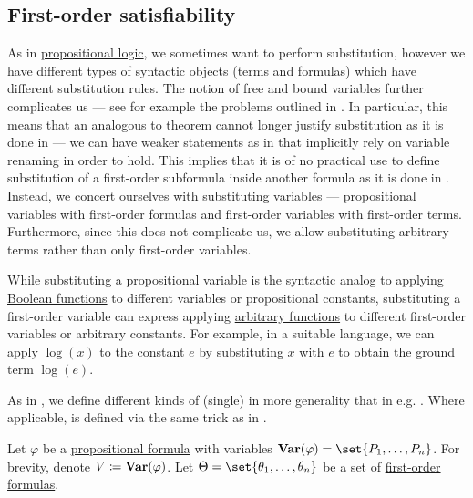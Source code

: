 \subsection{First-order satisfiability}\label{subsec:first_order_satisfiability}

\begin{definition}\label{def:first_order_substitution}
  As in \hyperref[subsec:propositional_logic]{propositional logic}, we sometimes want to perform substitution, however we have different types of syntactic objects (terms and formulas) which have different substitution rules. The notion of free and bound variables further complicates us --- see for example the problems outlined in . In particular, this means that an analogous to  theorem cannot longer justify substitution as it is done in  --- we can have weaker statements as in  that implicitly rely on variable renaming in order to hold. This implies that it is of no practical use to define substitution of a first-order subformula inside another formula as it is done in . Instead, we concert ourselves with substituting variables --- propositional variables with first-order formulas and first-order variables with first-order terms. Furthermore, since this does not complicate us, we allow substituting arbitrary terms rather than only first-order variables.

  While substituting a propositional variable is the syntactic analog to applying \hyperref[def:boolean_function]{Boolean functions} to different variables or propositional constants, substituting a first-order variable can express applying \hyperref[def:function/single_valued]{arbitrary functions} to different first-order variables or arbitrary constants. For example, in a suitable language, we can apply \( \log(x) \) to the constant \( e \) by substituting \( x \) with \( e \) to obtain the ground term \( \log(e) \).

  As in , we define different kinds of (single)  in more generality that in e.g. \cite[def. 15.25]{OpenLogicFull}. Where applicable,  is defined via the same trick as in .

  \begin{thmenum}
     Let \( \varphi \) be a \hyperref[def:propositional_syntax/formula]{propositional formula} with variables \( \boldop{Var}(\varphi) = \set{ P_1, \ldots, P_n } \). For brevity, denote \( V \coloneqq \operatorname{\mathbf{Var}}(\varphi) \). Let \( \Theta = \set{ \theta_1, \ldots, \theta_n } \) be a set of \hyperref[def:first_order_syntax/formula]{first-order formulas}.


\end{thmenum}
\end{definition}
